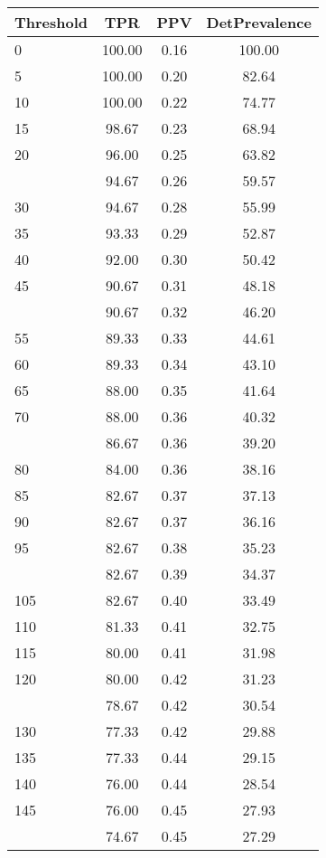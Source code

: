 \begin{table}[ht]
\centering
\begin{tabular}{lccc}
  \toprule
Threshold & TPR & PPV & DetPrevalence \\ 
  \midrule
0 & 100.00 & 0.16 & 100.00 \\ 
  5 & 100.00 & 0.20 & 82.64 \\ 
  10 & 100.00 & 0.22 & 74.77 \\ 
  15 & 98.67 & 0.23 & 68.94 \\ 
  20 & 96.00 & 0.25 & 63.82 \\ 
   \addlinespace
25 & 94.67 & 0.26 & 59.57 \\ 
  30 & 94.67 & 0.28 & 55.99 \\ 
  35 & 93.33 & 0.29 & 52.87 \\ 
  40 & 92.00 & 0.30 & 50.42 \\ 
  45 & 90.67 & 0.31 & 48.18 \\ 
   \addlinespace
50 & 90.67 & 0.32 & 46.20 \\ 
  55 & 89.33 & 0.33 & 44.61 \\ 
  60 & 89.33 & 0.34 & 43.10 \\ 
  65 & 88.00 & 0.35 & 41.64 \\ 
  70 & 88.00 & 0.36 & 40.32 \\ 
   \addlinespace
75 & 86.67 & 0.36 & 39.20 \\ 
  80 & 84.00 & 0.36 & 38.16 \\ 
  85 & 82.67 & 0.37 & 37.13 \\ 
  90 & 82.67 & 0.37 & 36.16 \\ 
  95 & 82.67 & 0.38 & 35.23 \\ 
   \addlinespace
100 & 82.67 & 0.39 & 34.37 \\ 
  105 & 82.67 & 0.40 & 33.49 \\ 
  110 & 81.33 & 0.41 & 32.75 \\ 
  115 & 80.00 & 0.41 & 31.98 \\ 
  120 & 80.00 & 0.42 & 31.23 \\ 
   \addlinespace
125 & 78.67 & 0.42 & 30.54 \\ 
  130 & 77.33 & 0.42 & 29.88 \\ 
  135 & 77.33 & 0.44 & 29.15 \\ 
  140 & 76.00 & 0.44 & 28.54 \\ 
  145 & 76.00 & 0.45 & 27.93 \\ 
   \addlinespace
150 & 74.67 & 0.45 & 27.29 \\ 

\end{tabular}
\end{table}
